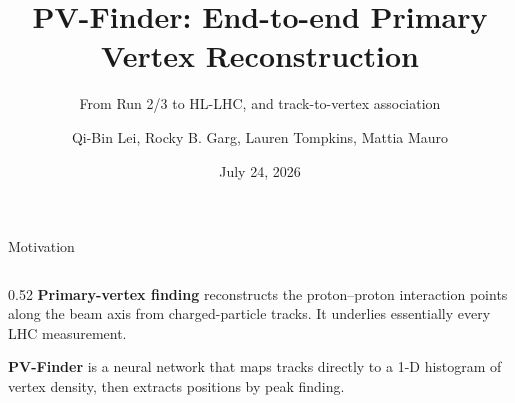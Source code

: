 \documentclass[xcolor=table,aspectratio=169]{beamer}
\title[PV-Finder]{PV-Finder: End-to-end Primary Vertex Reconstruction}
\subtitle{From Run 2/3 to HL-LHC, and track-to-vertex association}
\author[Mattia Mauro]{Qi-Bin Lei, Rocky B. Garg, Lauren Tompkins, \textcolor{pennred}{Mattia Mauro}}
\institute[]{Stanford University}
\date{July 24, 2026}
\def\thisframelogos{}
\newcommand{\framelogo}[1]{\def\thisframelogos{#1}}
\begin{document}
\framelogo{}

\begin{frame}[plain]
    \titlepage
\end{frame}


\begin{frame}{Motivation}
    \begin{columns}[c]
        \begin{column}{0.52\linewidth}
            \textbf{Primary-vertex finding} reconstructs the proton--proton
            interaction points along the beam axis from charged-particle tracks.
            It underlies essentially every LHC measurement.

            \vspace{0.55em}
            \textbf{PV-Finder} is a neural network that maps tracks directly to a
            1-D histogram of vertex density, then extracts positions by peak finding.


\end{column}
\end{columns}
\end{frame}
\end{document}
